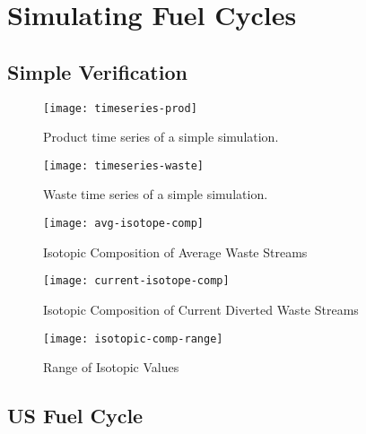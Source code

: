 \chapter[Simulating Fuel Cycles]{Simulating Fuel Cycles}
\section{Simple Verification}

\begin{figure}
	\centering
	\texttt{[image: timeseries-prod]}
	\caption{Product time series of a simple simulation.}
	\label{fig:timeseries-prod}
\end{figure}

\begin{figure}
	\centering
	\texttt{[image: timeseries-waste]}
	\caption{Waste time series of a simple simulation.}
	\label{fig:timeseries-waste}
\end{figure}

\begin{figure}
	\centering
	\texttt{[image: avg-isotope-comp]}
	\caption{Isotopic Composition of Average Waste Streams}
	\label{fig:avg-isotope-comp}
\end{figure}

\begin{figure}
	\centering
	\texttt{[image: current-isotope-comp]}
	\caption{Isotopic Composition of Current Diverted Waste Streams}
	\label{fig:current-isotope-comp}
\end{figure}

\begin{figure}
	\centering
	\texttt{[image: isotopic-comp-range]}
	\caption{Range of Isotopic Values}
	\label{fig:isotopic-range}
\end{figure}

\section{US Fuel Cycle}